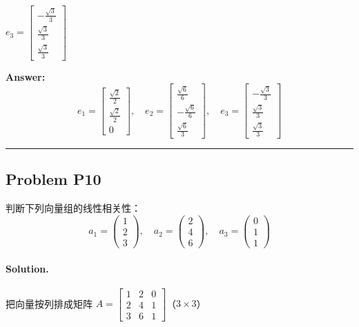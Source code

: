 \documentclass[12pt, a4paper]{article}
\newcommand{\problem}[1]{\subsection*{Problem #1}}
\newcommand{\solution}{\paragraph{Solution.}}
\begin{document}
$e_{3} = \left[\begin{matrix}- \frac{\sqrt{3}}{3}\\\frac{\sqrt{3}}{3}\\\frac{\sqrt{3}}{3}\end{matrix}\right]$

\textbf{Answer:}
\[e_{1} = \left[\begin{matrix}\frac{\sqrt{2}}{2}\\\frac{\sqrt{2}}{2}\\0\end{matrix}\right],\quad e_{2} = \left[\begin{matrix}\frac{\sqrt{6}}{6}\\- \frac{\sqrt{6}}{6}\\\frac{\sqrt{6}}{3}\end{matrix}\right],\quad e_{3} = \left[\begin{matrix}- \frac{\sqrt{3}}{3}\\\frac{\sqrt{3}}{3}\\\frac{\sqrt{3}}{3}\end{matrix}\right]\]


\vspace{1em}
\hrule
\vspace{1em}

\problem{P10}

判断下列向量组的线性相关性：
   $$a_1 = \begin{pmatrix} 1 \\ 2 \\ 3 \end{pmatrix}, \quad
   a_2 = \begin{pmatrix} 2 \\ 4 \\ 6 \end{pmatrix}, \quad
   a_3 = \begin{pmatrix} 0 \\ 1 \\ 1 \end{pmatrix}$$

\solution


把向量按列排成矩阵 $A = \left[\begin{matrix}1 & 2 & 0\\2 & 4 & 1\\3 & 6 & 1\end{matrix}\right]$（$3\times3$）
\end{document}
